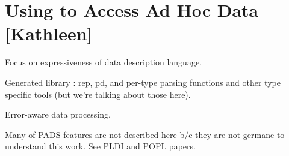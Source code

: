 \section{Using \pads{} to Access Ad Hoc Data [Kathleen]}
\label{section:pads}

Focus on expressiveness of data description language.

Generated library : rep, pd, and per-type parsing functions and other
type specific tools (but we're talking about those here). 

Error-aware data processing.  

Many of PADS features are not described here b/c they are not germane
to understand this work.  See PLDI and POPL papers. 
